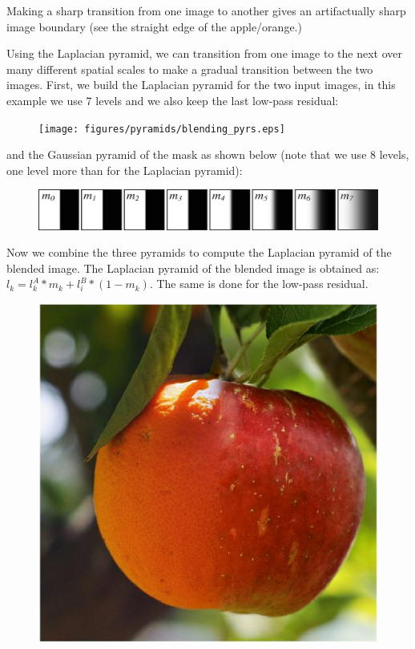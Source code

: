 Making a sharp transition from one image to another gives an artifactually sharp image boundary (see the straight edge of the apple/orange.)


Using the Laplacian pyramid, we can transition from one image to the next over many different spatial scales to make a gradual transition between the two images. First, we build the Laplacian pyramid for the two input images, in this example we use 7 levels and we also keep the last low-pass residual:
\begin{figure}[h!]
	\centerline{
		\texttt{[image: figures/pyramids/blending\_pyrs.eps]}
	}
\end{figure}

and the Gaussian pyramid of the mask as shown below (note that we use 8 levels, one level more than for the Laplacian pyramid):
\begin{figure}[h!]
	\centerline{
		\includegraphics[width=0.9\linewidth]{figures/pyramids/blending_pyrs_mask.eps}
	}
\end{figure}

Now we combine the three pyramids to compute the Laplacian pyramid of the blended image. The Laplacian pyramid of the blended image is obtained as: $l_k = l_k^A * m_k + l_i^B * (1-m_k)$. The same is done for the low-pass residual.

\begin{figure}[h!]
	\centerline{
		\includegraphics[width=0.45\linewidth]{figures/pyramids/apple_orange_laplacian_8levels.jpg}
	}
	\label{fig:appleorange}
\end{figure}
%
%


